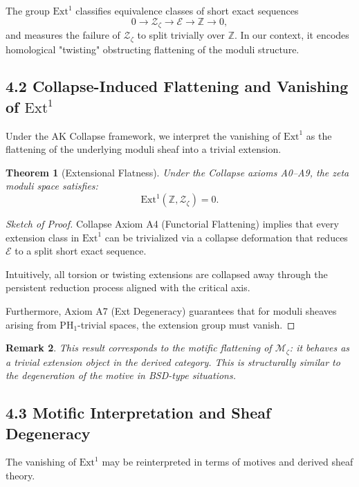 \documentclass[11pt]{article}
\newtheorem{theorem}{Theorem}[section]
\newtheorem{remark}[theorem]{Remark}
\begin{document}
The group $\mathrm{Ext}^1$ classifies equivalence classes of short exact sequences
\[
0 \rightarrow \mathcal{Z}_\zeta \rightarrow \mathcal{E} \rightarrow \mathbb{Z} \rightarrow 0,
\]
and measures the failure of $\mathcal{Z}_\zeta$ to split trivially over $\mathbb{Z}$.  
In our context, it encodes homological "twisting" obstructing flattening of the moduli structure.

\subsection{4.2 Collapse-Induced Flattening and Vanishing of $\mathrm{Ext}^1$}

Under the AK Collapse framework, we interpret the vanishing of $\mathrm{Ext}^1$ as the flattening of the underlying moduli sheaf into a trivial extension.

\begin{theorem}[Extensional Flatness]
Under the Collapse axioms A0–A9, the zeta moduli space satisfies:
\[
\mathrm{Ext}^1(\mathbb{Z}, \mathcal{Z}_\zeta) = 0.
\]
\end{theorem}

\begin{proof}[Sketch of Proof]
Collapse Axiom A4 (Functorial Flattening) implies that every extension class in $\mathrm{Ext}^1$  
can be trivialized via a collapse deformation that reduces $\mathcal{E}$ to a split short exact sequence.

Intuitively, all torsion or twisting extensions are collapsed away through the persistent reduction process aligned with the critical axis.

Furthermore, Axiom A7 (Ext Degeneracy) guarantees that for moduli sheaves arising from $\mathrm{PH}_1$-trivial spaces,  
the extension group must vanish.
\end{proof}

\begin{remark}
This result corresponds to the \emph{motific flattening} of $\mathcal{M}_\zeta$:  
it behaves as a trivial extension object in the derived category. This is structurally similar to the degeneration of the motive in BSD-type situations.
\end{remark}

\subsection{4.3 Motific Interpretation and Sheaf Degeneracy}

The vanishing of $\mathrm{Ext}^1$ may be reinterpreted in terms of motives and derived sheaf theory.
\end{document}

